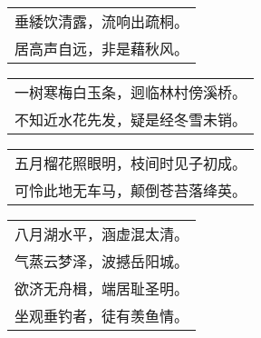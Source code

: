 \nopagebreak%
\nopagebreak%
\noindent\begin{minipage}{\linewidth}
  \vskip-3pt\begin{table}[H]
    \centering
    \begin{tabular}{@{}l@{}}
垂緌饮清露，流响出疏桐。\\
居高声自远，非是藉秋风。
    \end{tabular}
  \end{table}
\end{minipage}
\vspace{1cm}


\nopagebreak%
\nopagebreak%
\noindent\begin{minipage}{\linewidth}
  \vskip-3pt\begin{table}[H]
    \centering
    \begin{tabular}{@{}l@{}}
一树寒梅白玉条，迥临林村傍溪桥。\\
不知近水花先发，疑是经冬雪未销。
    \end{tabular}
  \end{table}
\end{minipage}
\vspace{1cm}


\nopagebreak%
\nopagebreak%
\noindent\begin{minipage}{\linewidth}
  \vskip-3pt\begin{table}[H]
    \centering
    \begin{tabular}{@{}l@{}}
五月榴花照眼明，枝间时见子初成。\\
可怜此地无车马，颠倒苍苔落绛英。
    \end{tabular}
  \end{table}
\end{minipage}
\vspace{1cm}


\nopagebreak%
\nopagebreak%
\noindent\begin{minipage}{\linewidth}
  \vskip-3pt\begin{table}[H]
    \centering
    \begin{tabular}{@{}l@{}}
八月湖水平，涵虚混太清。\\
气蒸云梦泽，波撼岳阳城。\\
欲济无舟楫，端居耻圣明。\\
坐观垂钓者，徒有羡鱼情。
    \end{tabular}
  \end{table}
\end{minipage}
\vspace{1cm}


